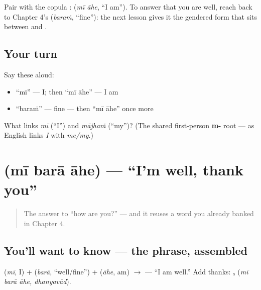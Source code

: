 \begin{grammarlens}[title={Grammar Lens: \textquotedblleft{}I am\textquotedblright{} is \emph{mī āhe}}]
Pair \textbf{} with the copula \textbf{}: \textbf{ } (\emph{mī āhe}, \textquotedblleft{}I am\textquotedblright{}). To answer that you are well, reach back to Chapter 4's \textbf{} (\emph{baraṁ}, \textquotedblleft{}fine\textquotedblright{}): the next lesson gives it the gendered form that sits between \textbf{} and \textbf{}.
\end{grammarlens}

\subsection*{Your turn}
Say these aloud:

\begin{itemize}
\raggedright
  \item \textquotedblleft{}mī\textquotedblright{} — I; then \textquotedblleft{}mī āhe\textquotedblright{} — I am
  \item \textquotedblleft{}baraṁ\textquotedblright{} — fine — then \textquotedblleft{}mī āhe\textquotedblright{} once more
\end{itemize}

\begin{tcolorbox}[breakable,colback=teal!4,colframe=teal!35!black,title={Before you move on}]
What links \emph{mī} (\textquotedblleft{}I\textquotedblright{}) and \emph{mājhaṁ} (\textquotedblleft{}my\textquotedblright{})? (The shared first-person \textbf{m-} root — as English links \emph{I} with \emph{me/my}.)
\end{tcolorbox}
\section[\texorpdfstring{\mr{मी} \mr{बरा} \mr{आहे} (mī barā āhe)}{मी बरा आहे (mī barā āhe)}]{   (mī barā āhe) — \textquotedblleft{}I'm well, thank you\textquotedblright{}}

\label{lesson:MR-C03-mi-bara-aahe}



\begin{quote}
The answer to \textquotedblleft{}how are you?\textquotedblright{} — and it reuses a word you already banked in Chapter 4.
\end{quote}

\subsection*{You'll want to know — the phrase, assembled}
\textbf{} (\emph{mī}, I) + \textbf{} (\emph{barā}, \textquotedblleft{}well/fine\textquotedblright{}) + \textbf{} (\emph{āhe}, am) $\to$ \textbf{  } — \textquotedblleft{}I am well.\textquotedblright{} Add thanks: \textbf{  , } (\emph{mī barā āhe, dhanyavād}).

